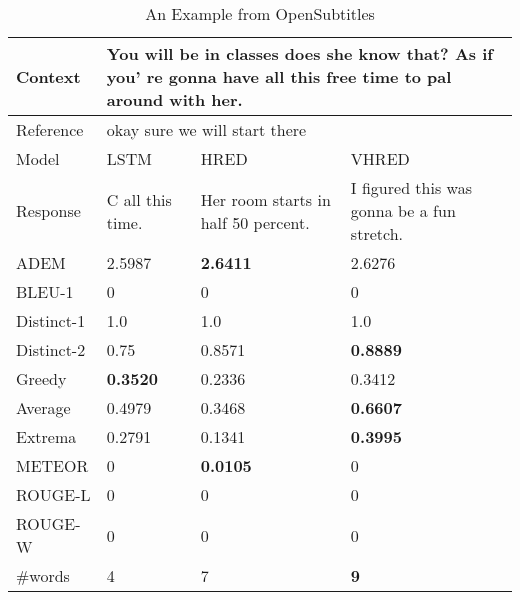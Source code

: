 \begin{table}[h]
    \caption{An Example from OpenSubtitles}
    \label{tab:Example_OpenSubtitles}
    \centering
    \begin{tabular}{|l|*{3}{p{}|}}
        \hline
        Context & \multicolumn{3}{p{0.64\textwidth}|}{You will be in classes does she know that? As if you' re gonna have all this free time to pal around with her.} \\
        \hline
        Reference & \multicolumn{3}{p{0.64\textwidth}|}{okay sure we will start there}. \\
        \hline
        Model & LSTM & HRED & VHRED \\
        \hline
        Response & C all this time. & Her room starts in half 50 percent. & I figured this was gonna be a fun stretch. \\
        \hline
        ADEM & 2.5987 & \textbf{2.6411} & 2.6276 \\
        \hline
        BLEU-1 & 0 & 0 & 0 \\
        \hline
        Distinct-1 & 1.0 & 1.0 & 1.0 \\
        \hline
        Distinct-2 & 0.75 & 0.8571 & \textbf{0.8889} \\
        \hline
        Greedy & \textbf{0.3520} & 0.2336 & 0.3412 \\
        \hline
        Average & 0.4979 & 0.3468 & \textbf{0.6607} \\
        \hline
        Extrema & 0.2791 & 0.1341 & \textbf{0.3995} \\
        \hline
        METEOR & 0 & \textbf{0.0105} & 0 \\
        \hline
        ROUGE-L & 0 & 0 & 0 \\
        \hline
        ROUGE-W & 0 & 0 & 0 \\
        \hline
        \#words & 4 & 7 & \textbf{9} \\
        \hline
    \end{tabular}
\end{table}
